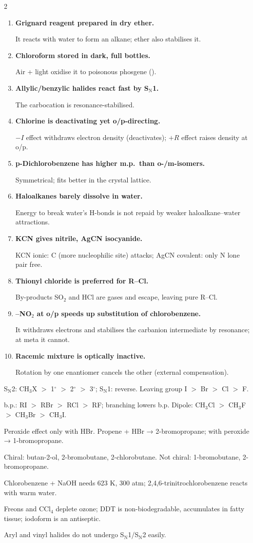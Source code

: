 \documentclass[10pt,a4paper]{extarticle}
\newenvironment{rqlist}{\begin{enumerate}[leftmargin=12pt,label={\sffamily\bfseries\scriptsize\color{uc}\arabic*.},itemsep=1pt]}{\end{enumerate}}
\newcommand{\ans}{\par\hspace*{2pt}{\color{uc}$\hookrightarrow$}\;}
\begin{document}
\begin{multicols}{2}
\begin{rqlist}
\item \textbf{Grignard reagent prepared in dry ether.}\ans It reacts with water to form an alkane; ether also stabilises it.
\item \textbf{Chloroform stored in dark, full bottles.}\ans Air + light oxidise it to poisonous phosgene ().
\item \textbf{Allylic/benzylic halides react fast by S$_\text{N}$1.}\ans The carbocation is resonance-stabilised.
\item \textbf{Chlorine is deactivating yet o/p-directing.}\ans $-I$ effect withdraws electron density (deactivates); $+R$ effect raises density at o/p.
\item \textbf{p-Dichlorobenzene has higher m.p.\ than o-/m-isomers.}\ans Symmetrical; fits better in the crystal lattice.
\item \textbf{Haloalkanes barely dissolve in water.}\ans Energy to break water's H-bonds is not repaid by weaker haloalkane--water attractions.
\item \textbf{KCN gives nitrile, AgCN isocyanide.}\ans KCN ionic: C (more nucleophilic site) attacks; AgCN covalent: only N lone pair free.
\item \textbf{Thionyl chloride is preferred for R--Cl.}\ans By-products SO$_2$ and HCl are gases and escape, leaving pure R--Cl.
\item \textbf{--NO$_2$ at o/p speeds up substitution of chlorobenzene.}\ans It withdraws electrons and stabilises the carbanion intermediate by resonance; at meta it cannot.
\item \textbf{Racemic mixture is optically inactive.}\ans Rotation by one enantiomer cancels the other (external compensation).
\end{rqlist}

\begin{fl}
\item S$_\text{N}$2: CH$_3$X $>$ 1$^\circ$ $>$ 2$^\circ$ $>$ 3$^\circ$; S$_\text{N}$1: reverse. Leaving group I $>$ Br $>$ Cl $>$ F.
\item b.p.: RI $>$ RBr $>$ RCl $>$ RF; branching lowers b.p. Dipole: CH$_3$Cl $>$ CH$_3$F $>$ CH$_3$Br $>$ CH$_3$I.
\item Peroxide effect only with HBr. Propene + HBr → 2-bromopropane; with peroxide → 1-bromopropane.
\item Chiral: butan-2-ol, 2-bromobutane, 2-chlorobutane. Not chiral: 1-bromobutane, 2-bromopropane.
\item Chlorobenzene + NaOH needs 623 K, 300 atm; 2,4,6-trinitrochlorobenzene reacts with warm water.
\item Freons and CCl$_4$ deplete ozone; DDT is non-biodegradable, accumulates in fatty tissue; iodoform is an antiseptic.
\item Aryl and vinyl halides do not undergo S$_\text{N}$1/S$_\text{N}$2 easily.
\end{fl}


\end{multicols}
\end{document}
